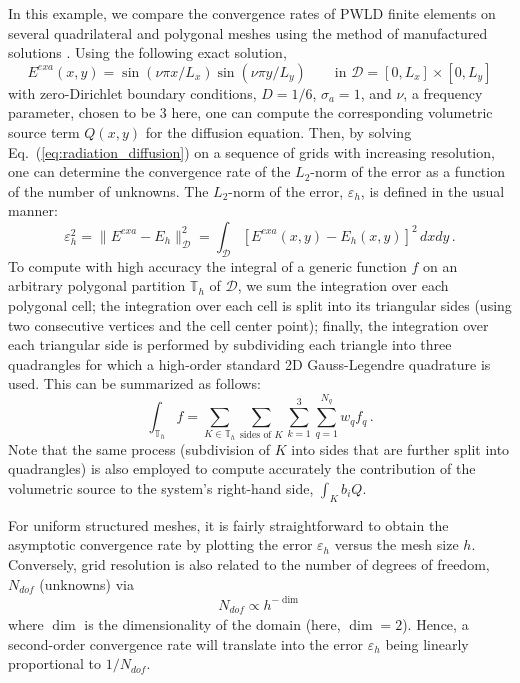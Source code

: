 \documentclass[preprint,10pt]{elsarticle}
\newcommand{\D}{\mathcal{D}}
\newcommand{\eqt}[1]{Eq.~(\ref{#1})}                     %
\newcommand{\tf}{b}
\begin{document}
In this example, we compare the convergence rates of PWLD finite elements on several quadrilateral
and polygonal meshes using the method of manufactured solutions \cite{roache_2009}. Using the following exact solution,
\begin{equation}
	E^{\textit{exa}}(x,y) = \sin(\nu \pi x/L_x) \sin(\nu\pi y/L_y) \qquad \text{in } \D=[0,L_x]\times [0,L_y]
\end{equation}
with zero-Dirichlet boundary conditions, $D=1/6$, $\sigma_a=1$, and $\nu$, a frequency parameter, chosen to be 3 here, one can compute 
the corresponding volumetric source term $Q(x,y)$ for the diffusion equation. Then, by solving \eqt{eq:radiation_diffusion} 
on a sequence of
grids with increasing resolution, one can determine the convergence rate of the $L_2$-norm of the error
as a function of the number of unknowns. The $L_2$-norm of the error, $\varepsilon_h$, is defined in the usual manner:
\begin{equation}
	\varepsilon_h^2 = \| E^{\textit{exa}} - E_h \|^2_\D = \int_\D \left[ E^{\textit{exa}}(x,y)  - E_h(x,y) \right]^2 \, dxdy	\, .
\end{equation}
To compute with high accuracy the integral of a generic function $f$ on an arbitrary polygonal partition $\mathbb{T}_h$ of $\D$, we sum the integration over each polygonal cell; the integration over each cell is split into its triangular sides (using two consecutive vertices and the cell center point); finally, the integration over each triangular side is performed by subdividing each triangle into three quadrangles for which a high-order standard 2D Gauss-Legendre quadrature is used. This can be summarized as follows:
\begin{equation}
	\int_{\mathbb{T}_h} f  = \sum_{K\in \mathbb{T}_h} \sum_{\text{sides of }K} \sum_{k=1}^3 
	\sum_{q=1}^{N_q} w_q f_q
	\, .
\end{equation}
Note that the same process (subdivision of $K$ into sides that are further split into quadrangles) is also employed to compute accurately the contribution of the volumetric source to the system's right-hand side, $\int_K \tf_i Q$.

For uniform structured meshes, it is fairly straightforward to obtain the asymptotic convergence rate by plotting the error $\varepsilon_h$ versus the mesh size $h$. Conversely, grid resolution is also related to the number of degrees of freedom, $N_\textit{dof}$ (unknowns) via 
\begin{equation}
N_{\textit{dof}} \propto  h ^{-\dim} 
\end{equation}
where $\dim$ is the dimensionality of the domain (here, $\dim = 2$). Hence, a second-order convergence rate will translate into the error $\varepsilon_h$ being linearly proportional to $1/N_{\textit{dof}}$.
\end{document}
